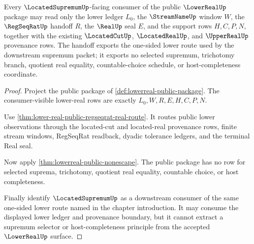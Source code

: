 \begin{theorem}
\label{thm:lowerreal-public-located-supremum-handoff}
Every $\LocatedSupremumUp$-facing consumer of the public $\LowerRealUp$ package may read only the lower ledger $L_0$, the $\StreamNameUp$ window $W$, the $\RegSeqRatUp$ handoff $R$, the $\RealUp$ seal $E$, and the support rows $H,C,P,N$, together with the existing $\LocatedCutUp$, $\LocatedRealUp$, and $\UpperRealUp$ provenance rows. The handoff exports the one-sided lower route used by the downstream supremum packet; it exports no selected supremum, trichotomy branch, quotient real equality, countable-choice schedule, or host-completeness coordinate.
\end{theorem}
\begin{proof}
Project the public package of \autoref{def:lowerreal-public-package}. The consumer-visible lower-real rows are exactly $L_0,W,R,E,H,C,P,N$.

Use \autoref{thm:lower-real-public-regseqrat-real-route}. It routes public lower observations through the located-cut and located-real provenance rows, finite stream windows, RegSeqRat readback, dyadic tolerance ledgers, and the terminal Real seal.

Now apply \autoref{thm:lowerreal-public-nonescape}. The public package has no row for selected suprema, trichotomy, quotient real equality, countable choice, or host completeness.

Finally identify $\LocatedSupremumUp$ as a downstream consumer of the same one-sided lower route named in the chapter introduction. It may consume the displayed lower ledger and provenance boundary, but it cannot extract a supremum selector or host-completeness principle from the accepted $\LowerRealUp$ surface.
\end{proof}

